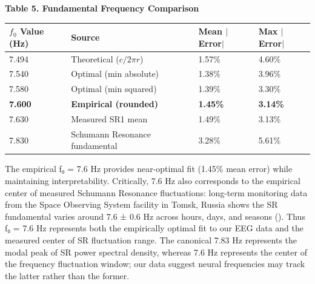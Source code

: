 \documentclass[11pt,a4paper]{article}
\begin{document}
\textbf{Table 5. Fundamental Frequency Comparison}
\begin{table}[H]
    \centering
    \begin{tabular}{llll}
        \toprule
        $f_0$ Value (Hz) & Source & Mean $|$Error$|$ & Max $|$Error$|$ \\
        \midrule
        7.494 & Theoretical ($c/2\pi r$) & 1.57\% & 4.60\% \\
        7.540 & Optimal (min absolute) & 1.38\% & 3.96\% \\
        7.580 & Optimal (min squared) & 1.39\% & 3.30\% \\
        \textbf{7.600} & \textbf{Empirical (rounded)} & \textbf{1.45\%} & \textbf{3.14\%} \\
        7.630 & Measured SR1 mean & 1.49\% & 3.13\% \\
        7.830 & Schumann Resonance fundamental & 3.28\% & 5.61\% \\
        \bottomrule
    \end{tabular}
\end{table}
The empirical f₀ = 7.6 Hz provides near-optimal fit (1.45\% mean error) while maintaining interpretability. Critically, 7.6 Hz also corresponds to the empirical center of measured Schumann Resonance fluctuations: long-term monitoring data from the Space Observing System facility in Tomsk, Russia shows the SR fundamental varies around 7.6 ± 0.6 Hz across hours, days, and seasons (\cite{nickolaenko2014schumann}). Thus f₀ = 7.6 Hz represents both the empirically optimal fit to our EEG data and the measured center of SR fluctuation range. The canonical 7.83 Hz represents the modal peak of SR power spectral density, whereas 7.6 Hz represents the center of the frequency fluctuation window; our data suggest neural frequencies may track the latter rather than the former.
\end{document}
